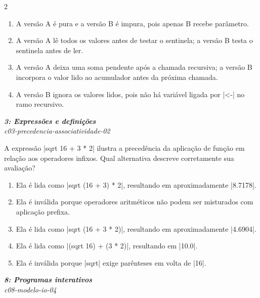 \documentclass[a4paper,10pt,brazil]{article}
\begin{document}
\begin{multicols}{2}
\begin{enumerate}
  \item A versão A é pura e a versão B é impura, pois apenas B recebe parâmetro.

  \item A versão A lê todos os valores antes de testar o sentinela; a versão B testa o sentinela antes de ler.

  \item A versão A deixa uma soma pendente após a chamada recursiva; a versão B incorpora o valor lido ao acumulador antes da próxima chamada.

  \item A versão B ignora os valores lidos, pois não há variável ligada por \haskellinline|<-| no ramo recursivo.


\end{enumerate}

\begin{flushright}
  \footnotesize
  \textit{\textbf{3: Expressões e definições}}\\
  \textit{c03-precedencia-associatividade-02}\\

\end{flushright}
A expressão \haskellinline|sqrt 16 + 3 * 2| ilustra a precedência da aplicação de função em relação aos operadores infixos. Qual alternativa descreve corretamente sua avaliação?

\begin{enumerate}
  \item Ela é lida como \haskellinline|sqrt (16 + 3) * 2|, resultando em aproximadamente \haskellinline|8.7178|.

  \item Ela é inválida porque operadores aritméticos não podem ser misturados com aplicação prefixa.

  \item Ela é lida como \haskellinline|sqrt (16 + 3 * 2)|, resultando em aproximadamente \haskellinline|4.6904|.

  \item Ela é lida como \haskellinline|(sqrt 16) + (3 * 2)|, resultando em \haskellinline|10.0|.

  \item Ela é inválida porque \haskellinline|sqrt| exige parênteses em volta de \haskellinline|16|.


\end{enumerate}

\begin{flushright}
  \footnotesize
  \textit{\textbf{8: Programas interativos}}\\
  \textit{c08-modelo-io-04}\\


\end{flushright}
\end{multicols}
\end{document}
